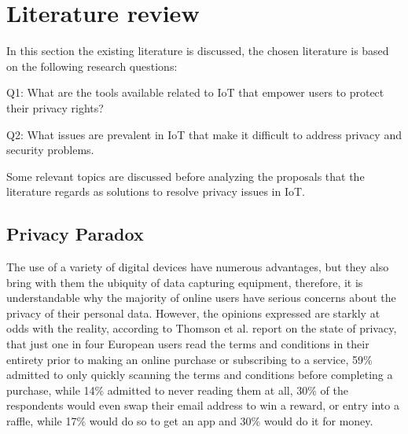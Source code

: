 \documentclass[conference]{IEEEtran}
\begin{document}
\section{Literature review}

In this section the existing literature is discussed, the chosen literature is
based on the following research questions:

Q1: What are the tools available related to IoT that empower users to protect
their privacy rights?

Q2: What issues are prevalent in IoT that make it difficult to address privacy
and security problems.

Some relevant topics are discussed before analyzing the proposals that the literature
regards as solutions to resolve privacy issues in IoT.

\subsection{Privacy Paradox}

The use of a variety of digital devices have numerous advantages, but they also
bring with them the ubiquity of data capturing equipment, therefore, it is
understandable why the majority of online users have serious concerns about
the privacy of their personal data. However, the opinions expressed are starkly
at odds with the reality, according to Thomson et al. \cite{DarrenState} report
on the state of privacy, that just one in four European users read the terms
and conditions in their entirety prior to making an online purchase or subscribing
to a service, 59\% admitted to only quickly scanning the terms and conditions before
completing a purchase, while 14\% admitted to never reading them at all, 30\% of
the respondents would even swap their email address to win a reward, or entry
into a raffle, while 17\% would do so to get an app and 30\% would do it for money.
\end{document}
